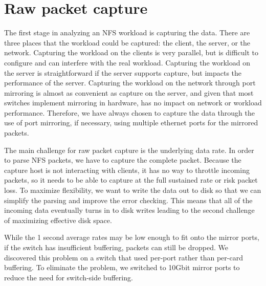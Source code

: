 \section{Raw packet capture}
\label{sec:capture}

The first stage in analyzing an NFS workload is capturing the data.
There are three places that the workload could be captured: the
client, the server, or the network.  Capturing the workload on the
clients is very parallel, but is difficult to configure and can
interfere with the real workload.  Capturing the workload on the
server is straightforward if the server supports capture, 
but impacts the performance of the
server.  Capturing the workload on the network through port mirroring
is almost as convenient as capture on the server, and given that most
switches implement mirroring in hardware, has no impact on network or
workload performance.  
Therefore, we have always chosen to capture the data through the use
of port mirroring, if necessary, using multiple ethernet ports for the
mirrored packets.

The main challenge for raw packet capture is the underlying data rate.
In order to parse NFS packets, we have to capture the complete packet.
Because the capture host is not interacting with clients, it has no
way to throttle incoming packets, so it needs to be able to capture at
the full sustained rate or risk packet loss.  To maximize flexibility,
we want to write the data out to disk so that we can simplify the
parsing and improve the error checking.  This means that all of the
incoming data eventually turns in to disk writes leading to the second
challenge of maximizing effective disk space.


While the 1 second average rates may be low enough to fit onto the mirror
ports, if the switch has insufficient buffering, packets can still be
dropped. We discovered this problem on a switch that used per-port
rather than per-card buffering.  To eliminate the problem, we switched
to 10Gbit mirror ports to reduce the need for switch-side buffering.

